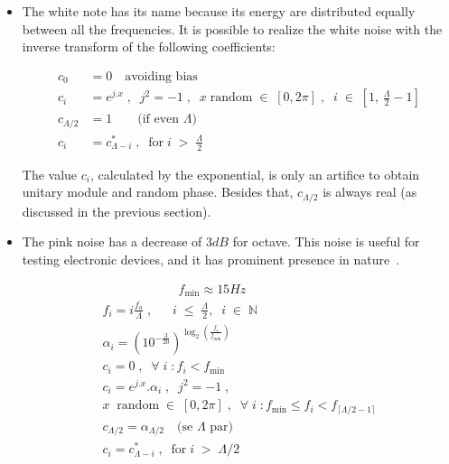 \documentclass[
 aip,
 jmp,
 amsmath,amssymb,
 reprint,
]{revtex4-1}
\begin{document}
\begin{itemize}

 \item The white note has its name because its energy are distributed equally between all the frequencies. It is possible to realize the white noise with the inverse transform of the following coefficients:

\begin{equation}\label{eq:branco}
 \begin{split}
 c_0 & =0 \quad \text{avoiding bias} \\
 c_i & =e^{j.x}\;,\;\; j^2=-1 \;, \;\; x \; \text{random} \; \in \; [0,2\pi]\;,\;\; i \; \in \; \left[1, \, \frac{\Lambda}{2}-1\right] \\
 c_{\Lambda/2} & = 1 \quad\quad \text{(if even $\Lambda$)}\\ 
 c_i & = c_{\Lambda - i}^*\;,\;\; \text{for}\;  i \; > \;  \frac{\Lambda}{2}
 \end{split}
\end{equation}

The value $c_i$, calculated by the exponential, is only an artifice to obtain unitary module and random phase. Besides that, $c_{\Lambda/2}$ is always real (as discussed in the previous section).

 \item The pink noise has a decrease of $3dB$ for octave. This noise is useful for testing electronic devices, and it has prominent presence in nature~\cite{Roederer}. 

\begin{multline}\label{eq:rosa}
 \qquad \qquad \qquad f_{\text{min}}  \approx 15 Hz \\
 f_i  = i \frac{f_a}{\Lambda} \;, \;\; \quad i \;\leq\; \frac{\Lambda}{2},\;\; i\;\in\;\mathbb{N}  \\
 \alpha_i  = \left(10^{-\frac{3}{20}}\right)^{\log _2 \left ( \frac{f_i}{f_{\text{min}}} \right )}  \\
 c_i  =0\;,\;\; \forall \; i \; : f_i<f_{\text{min}} \\
 c_i  =e^{j.x} . \alpha_i\;,\;\; j^2=-1 \;, \;\;\ \\ x \;\; \text{random} \; \in \; [0,2\pi]\;,\;\; \forall \; i \; : f_{\text{min}} \le f_i < f_{\lceil \Lambda/2-1 \rceil}  \\
 c_{\Lambda/2}  = \alpha_{\Lambda/2} \quad \text{(se $\Lambda$ par)} \\ 
 c_i  = c_{\Lambda - i}^*\;,\;\; \text{for}\;  i \; > \;  \Lambda/2 \qquad \qquad
\end{multline}
 


\end{itemize}
\end{document}
